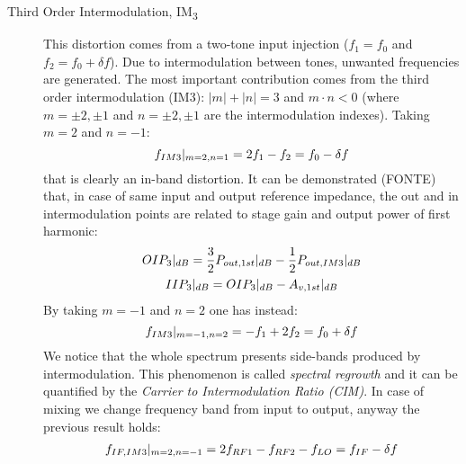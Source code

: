 \begin{description}
	\item [Third Order Intermodulation, IM\textsubscript{3}] This distortion comes from a two-tone input injection ($f_1 = f_0$ and $f_2=f_0+\delta f$). Due to intermodulation between tones, unwanted frequencies are generated. The most important contribution comes from the third order intermodulation (IM3): $|m|+|n|=3$ and $m\cdot n<0$ (where $m=\pm2,\pm1$ and $n=\pm2,\pm1$ are the intermodulation indexes). Taking $m=2$ and $n=-1$:
	\begin{equation}
		f_{IM3}|_{m=2,n=1} =  2f_1 - f_2 = f_0 - \delta f \notag
	\end{equation}
	that is clearly an in-band distortion.
	It can be demonstrated (FONTE) that, in case of same input and output reference impedance, the out and in intermodulation points are related to stage gain and output power of first harmonic:
	\begin{gather}
	OIP_3|_{dB} = \frac{3}{2}P_{out,1st}|_{dB}-\frac{1}{2}P_{out,IM3}|_{dB} \notag \\
	IIP_3|_{dB} = OIP_3|_{dB}-A_{v,1st}|_{dB} \notag
	\end{gather} 
	By taking $m=-1$ and $n=2$ one has instead:
	\begin{equation}
	f_{IM3}|_{m=-1,n=2} =  -f_1 +2 f_2 = f_0 + \delta f \notag
	\end{equation} 
	We notice that the whole spectrum presents side-bands produced by intermodulation. This phenomenon is called \emph{spectral regrowth} and it can be quantified by the \emph{Carrier to Intermodulation Ratio (CIM)}.
	In case of mixing we change frequency band from input to output, anyway the previous result holds:
	\begin{gather}
			f_{IF,IM3}|_{m=2,n=-1} = 2f_{RF1} - f_{RF2} -f_{LO}= f_{IF} - \delta f \notag
	\end{gather}
\end{description}
